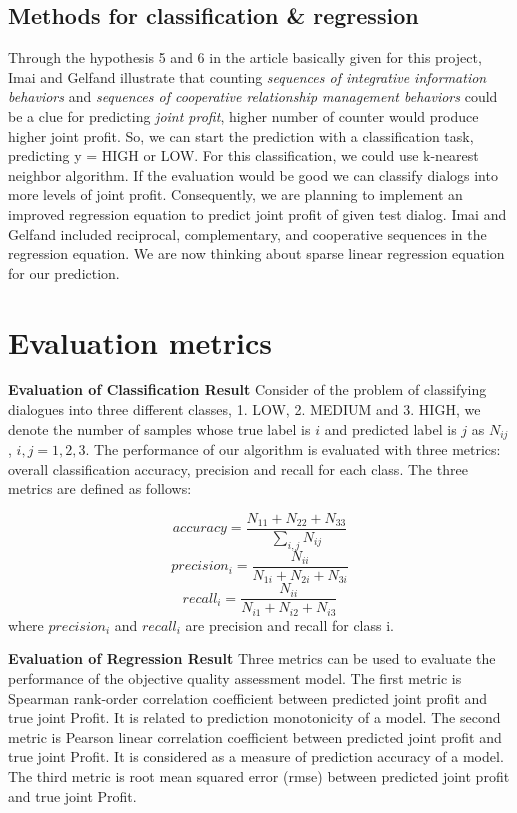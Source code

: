 \documentclass[11pt]{article} %
\begin{document}
\subsection{Methods for classification \& regression}
Through the hypothesis 5 and 6 in the article basically given for this project, Imai and Gelfand illustrate that counting \textit{sequences of integrative information behaviors} and \textit{sequences of cooperative relationship management behaviors} could be a clue for predicting \textit{joint profit}, higher number of counter would produce higher joint profit.
So, we can start the prediction with a classification task, predicting y = HIGH or LOW.  For this classification, we could use k-nearest neighbor algorithm. If the evaluation would be good we can classify dialogs into more levels of joint profit.\newline
Consequently, we are planning to implement an improved regression equation to predict joint profit of given test dialog. Imai and Gelfand included reciprocal, complementary, and cooperative sequences in the regression equation. We are now thinking about sparse linear regression equation for our prediction.


\section{Evaluation metrics} %
\textbf{Evaluation of Classification Result}
Consider of the problem of classifying dialogues into three different classes, 1. LOW, 2. MEDIUM and 3. HIGH, we denote the number of samples whose true label is $i$ and predicted label is $j$ as $N_{ij}$, $i,j=1,2,3$. The performance of our algorithm is evaluated with three metrics: overall classification accuracy, precision and recall for each class. The three metrics are defined as follows:

\begin{equation*}
accuracy = \frac{N_{11}+N_{22}+N_{33}}{\sum_{i,j}N_{ij}}
\end{equation*}
\begin{equation*}
precision_{i}=\frac{N_{ii}}{N_{1i}+N_{2i}+N_{3i}}
\end{equation*}
\begin{equation*}
recall_{i}=\frac{N_{ii}}{N_{i1}+N_{i2}+N_{i3}}
\end{equation*}
where $precision_i$ and $recall_i$ are precision and recall for class i.

\textbf{Evaluation of Regression Result}
Three metrics can be used to evaluate the performance of the objective quality assessment model. The first metric is Spearman rank-order correlation coefficient between predicted joint profit and true joint Profit. It is related to prediction monotonicity of a model. The second metric is Pearson linear correlation coefficient between predicted joint profit and true joint Profit. It is considered as a measure of prediction accuracy of a model. The third metric is root mean squared error (rmse) between predicted joint profit and true joint Profit.
\end{document}
